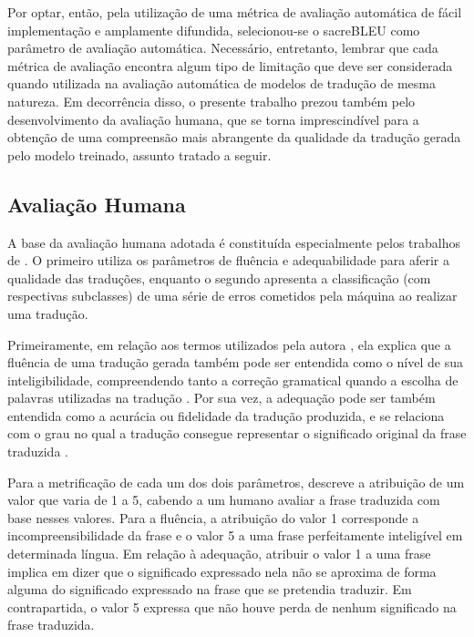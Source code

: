 \documentclass[portuguese]{textolivre}
\begin{document}
Por optar, então, pela utilização de uma métrica de avaliação automática de fácil implementação e amplamente difundida, selecionou-se o sacreBLEU como parâmetro de avaliação automática. Necessário, entretanto, lembrar que cada métrica de avaliação encontra algum tipo de limitação que deve ser considerada quando utilizada na avaliação automática de modelos de tradução de mesma natureza. Em decorrência disso, o presente trabalho prezou também pelo desenvolvimento da avaliação humana, que se torna imprescindível para a obtenção de uma compreensão mais abrangente da qualidade da tradução gerada pelo modelo treinado, assunto tratado a seguir.

\subsection{Avaliação Humana}\label{sec-formato}
A base da avaliação humana adotada é constituída especialmente pelos trabalhos de \textcite{banitz_machine_2020,vilar_error_2006}. O primeiro utiliza os parâmetros de fluência e adequabilidade para aferir a qualidade das traduções, enquanto o segundo apresenta a classificação (com respectivas subclasses) de uma série de erros cometidos pela máquina ao realizar uma tradução.

Primeiramente, em relação aos termos utilizados pela autora \textcite{banitz_machine_2020}, ela explica que a fluência de uma tradução gerada também pode ser entendida como o nível de sua inteligibilidade, compreendendo tanto a correção gramatical quando a escolha de palavras utilizadas na tradução \cite{douglas_machine_1994,kalyani_evaluation_2014}. Por sua vez, a adequação pode ser também entendida como a acurácia ou fidelidade da tradução produzida, e se relaciona com o grau no qual a tradução consegue representar o significado original da frase traduzida \cite{douglas_machine_1994,kalyani_evaluation_2014}.

Para a metrificação de cada um dos dois parâmetros, \textcite[p. 63]{banitz_machine_2020} descreve a atribuição de um valor que varia de 1 a 5, cabendo a um humano avaliar a frase traduzida com base nesses valores. Para a fluência, a atribuição do valor 1 corresponde a incompreensibilidade da frase e o valor 5 a uma frase perfeitamente inteligível em determinada língua. Em relação à adequação, atribuir o valor 1 a uma frase implica em dizer que o significado expressado nela não se aproxima de forma alguma do significado expressado na frase que se pretendia traduzir. Em contrapartida, o valor 5 expressa que não houve perda de nenhum significado na frase traduzida.
\end{document}
